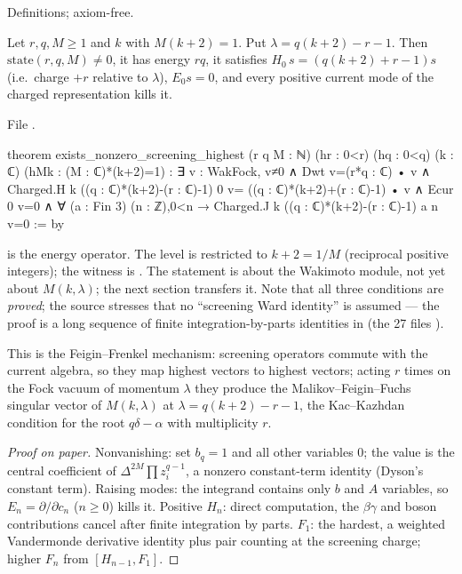 \begin{status}
Definitions; axiom-free.
\end{status}

\begin{theorem}\label{l08:thm:screen}
Let $r,q,M\ge1$ and $k$ with $M(k+2)=1$. Put $\lambda = q(k+2)-r-1$. Then $\mathrm{state}(r,q,M)\ne0$, it has
energy $rq$, it satisfies $H_0\,s = (q(k+2)+r-1)s$ (i.e.\ charge $+r$ relative to $\lambda$), $E_0s=0$, and every
positive current mode of the charged representation kills it.
\end{theorem}

\noindent File .
\begin{leancode}
theorem exists_nonzero_screening_highest (r q M : ℕ) (hr : 0<r) (hq : 0<q)
    (k : ℂ) (hMk : (M : ℂ)*(k+2)=1) :
    ∃ v : WakFock, v≠0 ∧ Dwt v=(r*q : ℂ) • v ∧
      Charged.H k ((q : ℂ)*(k+2)-(r : ℂ)-1) 0 v=
        ((q : ℂ)*(k+2)+(r : ℂ)-1) • v ∧
      Ecur 0 v=0 ∧
      ∀ (a : Fin 3) (n : ℤ),0<n →
        Charged.J k ((q : ℂ)*(k+2)-(r : ℂ)-1) a n v=0 := by
\end{leancode}

\begin{dictionary}
 is the energy operator. The level is restricted to $k+2 = 1/M$ (reciprocal positive
integers); the witness is . The statement is about the Wakimoto module, not yet about
$M(k,\lambda)$; the next section transfers it. Note that all three conditions are \emph{proved}; the source
stresses that no ``screening Ward identity'' is assumed --- the proof is a long sequence of finite
integration-by-parts identities in  (the 27 files ).
\end{dictionary}

\begin{physics}
This is the Feigin--Frenkel mechanism: screening operators commute with the current algebra, so they
map highest vectors to highest vectors; acting $r$ times on the Fock vacuum of momentum $\lambda$ they produce
the Malikov--Feigin--Fuchs singular vector of $M(k,\lambda)$ at $\lambda = q(k+2)-r-1$, the Kac--Kazhdan
condition for the root $q\delta-\alpha$ with multiplicity $r$.
\end{physics}

\begin{proof}[Proof on paper]
Nonvanishing: set $b_q=1$ and all other variables $0$; the value is the central coefficient of
$\Delta^{2M}\prod z_i^{q-1}$, a nonzero constant-term identity (Dyson's constant term). Raising modes: the
integrand contains only $b$ and $A$ variables, so $E_n = \partial/\partial c_n$ ($n\ge0$) kills it. Positive $H_n$:
direct computation, the $\beta\gamma$ and boson contributions cancel after finite integration by parts.
$F_1$: the hardest, a weighted Vandermonde derivative identity plus pair counting at the screening
charge; higher $F_n$ from $[H_{n-1},F_1]$.
\end{proof}

